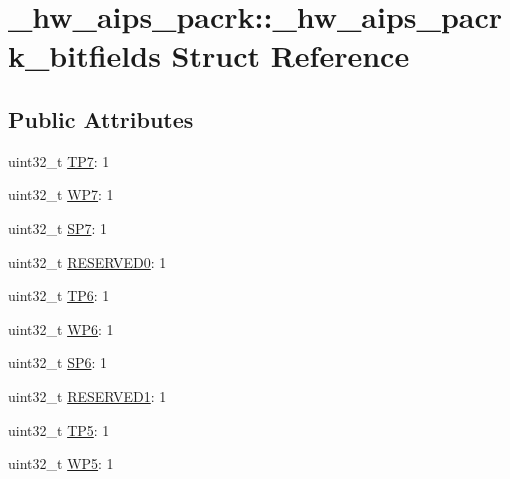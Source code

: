 \hypertarget{struct__hw__aips__pacrk_1_1__hw__aips__pacrk__bitfields}{}\section{\+\_\+hw\+\_\+aips\+\_\+pacrk\+:\+:\+\_\+hw\+\_\+aips\+\_\+pacrk\+\_\+bitfields Struct Reference}
\label{struct__hw__aips__pacrk_1_1__hw__aips__pacrk__bitfields}
\subsection*{Public Attributes}
\begin{DoxyCompactItemize}
\item 
uint32\+\_\+t \hyperlink{struct__hw__aips__pacrk_1_1__hw__aips__pacrk__bitfields_a3dfec75a752458b6942b718ca0d821d5}{T\+P7}\+: 1
\item 
uint32\+\_\+t \hyperlink{struct__hw__aips__pacrk_1_1__hw__aips__pacrk__bitfields_a697bf9e23b5ce649ca0402598f107688}{W\+P7}\+: 1
\item 
uint32\+\_\+t \hyperlink{struct__hw__aips__pacrk_1_1__hw__aips__pacrk__bitfields_a40a1e6c420f670bcd41188e882b32de5}{S\+P7}\+: 1
\item 
uint32\+\_\+t \hyperlink{struct__hw__aips__pacrk_1_1__hw__aips__pacrk__bitfields_a2aafb422a917c81ce990050d002d4644}{R\+E\+S\+E\+R\+V\+E\+D0}\+: 1
\item 
uint32\+\_\+t \hyperlink{struct__hw__aips__pacrk_1_1__hw__aips__pacrk__bitfields_a1daee6a86eeb829f25412c8c17de9c2c}{T\+P6}\+: 1
\item 
uint32\+\_\+t \hyperlink{struct__hw__aips__pacrk_1_1__hw__aips__pacrk__bitfields_a942b7549fbb3737083357c16dfd9bb88}{W\+P6}\+: 1
\item 
uint32\+\_\+t \hyperlink{struct__hw__aips__pacrk_1_1__hw__aips__pacrk__bitfields_adce22818d0a67ec8fa09244269886b44}{S\+P6}\+: 1
\item 
uint32\+\_\+t \hyperlink{struct__hw__aips__pacrk_1_1__hw__aips__pacrk__bitfields_a9a34889f4ec0bd9cbf16dc2022971854}{R\+E\+S\+E\+R\+V\+E\+D1}\+: 1
\item 
uint32\+\_\+t \hyperlink{struct__hw__aips__pacrk_1_1__hw__aips__pacrk__bitfields_a3dda4b3e5fc78e948b6b0a311539e81c}{T\+P5}\+: 1
\item 
uint32\+\_\+t \hyperlink{struct__hw__aips__pacrk_1_1__hw__aips__pacrk__bitfields_a81ab1362c30099d3680d7a21e824aed0}{W\+P5}\+: 1

\end{DoxyCompactItemize}

